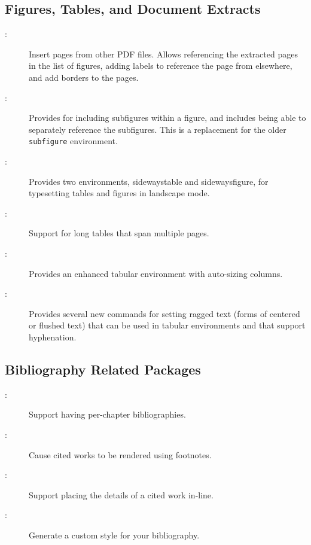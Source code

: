 \subsection{Figures, Tables, and Document Extracts}

\begin{description}
\item[:]
    Insert pages from other PDF files.  Allows referencing the extracted
    pages in the list of figures, adding labels to reference the page
    from elsewhere, and add borders to the pages.

\item[:]
    Provides for including subfigures within a figure, and includes
    being able to separately reference the subfigures.  This is a
    replacement for the older \texttt{subfigure} environment.

\item[:]
    Provides two environments, sidewaystable and sidewaysfigure,
    for typesetting tables and figures in landscape mode.  

\item[:]
    Support for long tables that span multiple pages.

\item[:]
    Provides an enhanced tabular environment with auto-sizing columns.

\item[:]
    Provides several new commands for setting ragged text (\eg forms
    of centered or flushed text) that can be used in tabular
    environments and that support hyphenation.

\end{description}


\subsection{Bibliography Related Packages}

\begin{description}
\item[:]
    Support having per-chapter bibliographies.

\item[:]
    Cause cited works to be rendered using footnotes.

\item[:] 
    Support placing the details of a cited work in-line.

\item[:]
    Generate a custom style for your bibliography.

\end{description}


